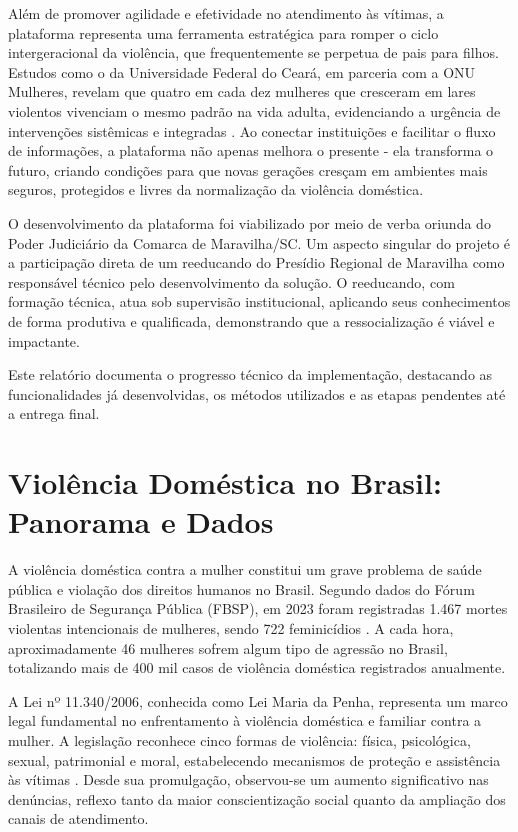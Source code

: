 \par Além de promover agilidade e efetividade no atendimento às vítimas, a plataforma representa uma ferramenta estratégica para romper o ciclo intergeracional da violência, que frequentemente se perpetua de pais para filhos. Estudos como o da Universidade Federal do Ceará, em parceria com a ONU Mulheres, revelam que quatro em cada dez mulheres que cresceram em lares violentos vivenciam o mesmo padrão na vida adulta, evidenciando a urgência de intervenções sistêmicas e integradas \cite{carvalho2017transmissao}. Ao conectar instituições e facilitar o fluxo de informações, a plataforma não apenas melhora o presente - ela transforma o futuro, criando condições para que novas gerações cresçam em ambientes mais seguros, protegidos e livres da normalização da violência doméstica.


\par O desenvolvimento da plataforma foi viabilizado por meio de verba oriunda do Poder Judiciário da Comarca de Maravilha/SC. Um aspecto singular do projeto é a participação direta de um reeducando do Presídio Regional de Maravilha como responsável técnico pelo desenvolvimento da solução. O reeducando, com formação técnica, atua sob supervisão institucional, aplicando seus conhecimentos de forma produtiva e qualificada, demonstrando que a ressocialização é viável e impactante.

\par Este relatório documenta o progresso técnico da implementação, destacando as funcionalidades já desenvolvidas, os métodos utilizados e as etapas pendentes até a entrega final.

\section{Violência Doméstica no Brasil: Panorama e Dados}

\par A violência doméstica contra a mulher constitui um grave problema de saúde pública e violação dos direitos humanos no Brasil. Segundo dados do Fórum Brasileiro de Segurança Pública (FBSP), em 2023 foram registradas 1.467 mortes violentas intencionais de mulheres, sendo 722 feminicídios \cite{fbsp2024}. A cada hora, aproximadamente 46 mulheres sofrem algum tipo de agressão no Brasil, totalizando mais de 400 mil casos de violência doméstica registrados anualmente.

\par A Lei nº 11.340/2006, conhecida como Lei Maria da Penha, representa um marco legal fundamental no enfrentamento à violência doméstica e familiar contra a mulher. A legislação reconhece cinco formas de violência: física, psicológica, sexual, patrimonial e moral, estabelecendo mecanismos de proteção e assistência às vítimas \cite{brasil2006}. Desde sua promulgação, observou-se um aumento significativo nas denúncias, reflexo tanto da maior conscientização social quanto da ampliação dos canais de atendimento.

